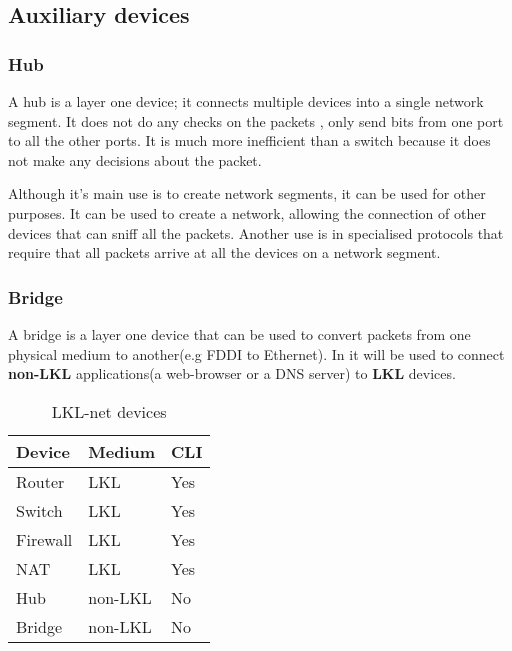 \subsection{Auxiliary devices}
\label{sub-sec:auxdev}

\subsubsection{Hub}

A hub is a layer one device; it connects multiple devices into a single network segment. It does not do any checks on the packets
, only send bits from one port to all the other ports.  It is much more inefficient than a switch because it does not make any decisions
about the packet.

Although it's main use is to create network segments, it can be used for other purposes. It can be used to create a network, allowing
the connection of other devices that can sniff all the packets. Another use is in specialised protocols that require that all packets 
arrive at all the devices on a network segment.

\subsubsection{Bridge}

A bridge is a layer one device that can be used to convert packets from one physical medium to another(e.g FDDI to Ethernet). In 
\textbf{\project} it will be used to connect \textbf{non-LKL} applications(a web-browser or a DNS server) to \textbf{LKL} devices.

\begin{center}
  \begin{table}[htb]
  \begin{center}
  \begin{tabular}{ | l | l | l |}
    \hline
      Device & Medium & CLI\\ \hline
      Router & LKL & Yes \\ \hline
      Switch & LKL & Yes \\ \hline
      Firewall & LKL & Yes \\ \hline
      NAT & LKL & Yes \\ \hline
      Hub & non-LKL & No \\ \hline
      Bridge & non-LKL & No \\ 
    \hline
  \end{tabular}
  \end{center}
  \caption{LKL-net devices}
  \label{table:tdevices}
  \end{table}
\end{center}

